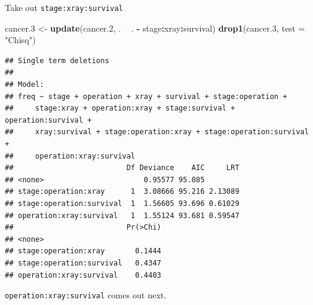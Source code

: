 \documentclass[ignorenonframetext,]{beamer}
\newenvironment{Shaded}{\begin{snugshade}}{\end{snugshade}}
\newcommand{\DataTypeTok}[1]{\textcolor[rgb]{0.13,0.29,0.53}{#1}}
\newcommand{\FloatTok}[1]{\textcolor[rgb]{0.00,0.00,0.81}{#1}}
\newcommand{\KeywordTok}[1]{\textcolor[rgb]{0.13,0.29,0.53}{\textbf{#1}}}
\newcommand{\NormalTok}[1]{#1}
\newcommand{\OperatorTok}[1]{\textcolor[rgb]{0.81,0.36,0.00}{\textbf{#1}}}
\newcommand{\StringTok}[1]{\textcolor[rgb]{0.31,0.60,0.02}{#1}}
\begin{document}
\begin{frame}[fragile]{Take out \texttt{stage:xray:survival}}
\protect\hypertarget{take-out-stagexraysurvival}{}

\begin{Shaded}
\begin{Highlighting}[]
\NormalTok{cancer}\FloatTok{.3}\NormalTok{ <-}\StringTok{ }\KeywordTok{update}\NormalTok{(cancer}\FloatTok{.2}\NormalTok{, . }\OperatorTok{~}\StringTok{ }\NormalTok{. }\OperatorTok{-}\StringTok{ }\NormalTok{stage}\OperatorTok{:}\NormalTok{xray}\OperatorTok{:}\NormalTok{survival)}
\KeywordTok{drop1}\NormalTok{(cancer}\FloatTok{.3}\NormalTok{, }\DataTypeTok{test =} \StringTok{"Chisq"}\NormalTok{)}
\end{Highlighting}
\end{Shaded}

\begin{verbatim}
## Single term deletions
## 
## Model:
## freq ~ stage + operation + xray + survival + stage:operation + 
##     stage:xray + operation:xray + stage:survival + operation:survival + 
##     xray:survival + stage:operation:xray + stage:operation:survival + 
##     operation:xray:survival
##                          Df Deviance    AIC     LRT
## <none>                       0.95577 95.085        
## stage:operation:xray      1  3.08666 95.216 2.13089
## stage:operation:survival  1  1.56605 93.696 0.61029
## operation:xray:survival   1  1.55124 93.681 0.59547
##                          Pr(>Chi)
## <none>                           
## stage:operation:xray       0.1444
## stage:operation:survival   0.4347
## operation:xray:survival    0.4403
\end{verbatim}

\texttt{operation:xray:survival} comes out next.

\end{frame}
\end{document}
